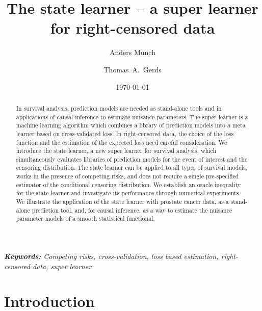 \documentclass[11pt]{article}
\title{\Large The state learner -- a super learner for right-censored data}
\date{\small \today}
\author[1,*]{\normalsize Anders Munch}
\author[1]{\normalsize Thomas~A.~Gerds}
\affil[1]{\normalsize Section of Biostatistics, University of Copenhagen}
\affil[*]{\normalsize Address for correspondence: \href{email:email-id.com}{a.munch@sund.ku.dk}}
\theoremstyle{thmstyleone}%
\theoremstyle{thmstyletwo}%
\theoremstyle{thmstylethree}%
\newcommand{\1}{\mathds{1}}
\begin{document}
\maketitle

\begin{abstract}
  In survival analysis, prediction models are needed as stand-alone tools and in
  applications of causal inference to estimate nuisance parameters. The super
  learner is a machine learning algorithm which combines a library of prediction
  models into a meta learner based on cross-validated loss. In right-censored
  data, the choice of the loss function and the estimation of the expected loss
  need careful consideration. We introduce the state learner, a new super
  learner for survival analysis, which simultaneously evaluates libraries of
  prediction models for the event of interest and the censoring distribution.
  The state learner can be applied to all types of survival models, works in the
  presence of competing risks, and does not require a single pre-specified
  estimator of the conditional censoring distribution. We establish an oracle
  inequality for the state learner and investigate its performance through
  numerical experiments. We illustrate the application of the state learner with
  prostate cancer data, as a stand-alone prediction tool, and, for causal
  inference, as a way to estimate the nuisance parameter models of a smooth
  statistical functional.
\end{abstract}


\textit{{\small \textbf{Keywords:} Competing risks, cross-validation, loss based
    estimation, right-censored data, super learner}}

\pagebreak

\section{Introduction}
\label{sec:introduction}
\end{document}

